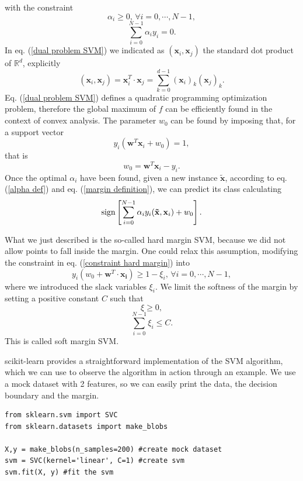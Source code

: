 \documentclass[12pt]{article}
\begin{document}
with the constraint
\begin{equation}
    \alpha_i\geq 0,\,\forall i=0,\cdots, N-1,
\end{equation}
\begin{equation}
    \sum_{i=0}^{N-1}\alpha_iy_i=0.
\end{equation}
In eq. (\ref{dual problem SVM}) we indicated as $(\mathbf{x}_i,\mathbf{x}_j)$ the standard dot product of $\mathbb{R}^d$, explicitly
$$(\mathbf{x}_i,\mathbf{x}_j)=\mathbf{x}_i^T\cdot\mathbf{x}_j=\sum_{k=0}^{d-1}(\mathbf{x}_i)_k(\mathbf{x}_j)_k.$$
Eq. (\ref{dual problem SVM}) defines a quadratic programming
optimization problem, therefore the global maximum of $f$ can be efficiently found in the context of convex analysis. The parameter $w_0$ can be found by imposing that, for a support vector $$y_i(\mathbf{w}^T\mathbf{x}_i+w_0)=1,$$ that is 
\begin{equation}
    w_0=\mathbf{w}^T\mathbf{x}_i-y_i.
\end{equation} 
Once the optimal $\alpha_i$ have been found, given a new instance $\mathbf{\tilde{x}}$, according to eq. (\ref{alpha def}) and eq. (\ref{margin definition}), we can predict its class calculating 
\begin{equation}
    \textup{sign}\left[\sum_{i=0}^{N-1}\alpha_iy_i(\mathbf{\tilde{x}}, \mathbf{x}_i)+w_0\right].
    \label{decision boundary svm}
\end{equation} 

What we just described is the so-called hard margin SVM, because we did not allow points to fall inside the margin. One could relax this assumption, modifying the constraint in eq. (\ref{constraint hard margin}) into 
\begin{equation}
    y_i(w_0+\mathbf{w}^T\cdot \mathbf{x_i})\geq 1-\xi_i, \, \forall i=0,\cdots, N-1,
\end{equation}
where we introduced the slack variables $\xi_i$. We limit the softness of the margin by setting a positive constant $C$ such that 
$$ \xi\geq0,$$
\begin{equation}
    \sum_{i=0}^{N-1}\xi_i\leq C.
\end{equation}
This is called soft margin SVM. 

scikit-learn provides a straightforward implementation of the SVM algorithm, which we can use to observe the algorithm in action through an example. We use a mock dataset with 2 features, so we can easily print the data, the decision boundary and the margin. 


\begin{lstlisting}
from sklearn.svm import SVC
from sklearn.datasets import make_blobs 

X,y = make_blobs(n_samples=200) #create mock dataset
svm = SVC(kernel='linear', C=1) #create svm
svm.fit(X, y) #fit the svm
\end{lstlisting}
\end{document}
